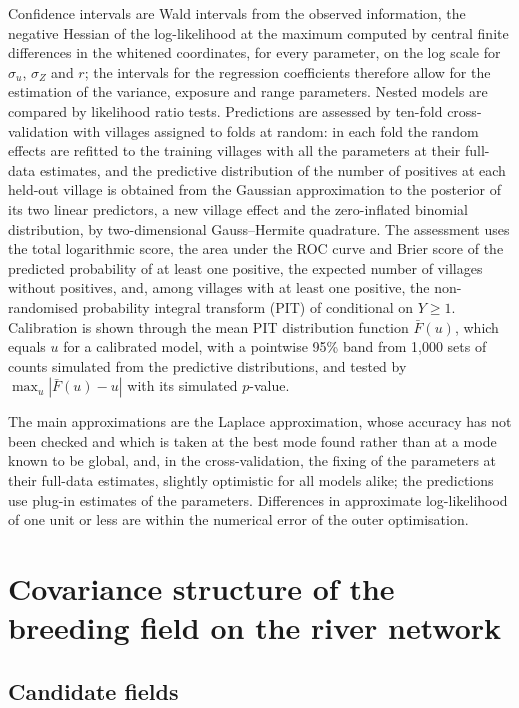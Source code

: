 \documentclass[11pt,a4paper]{article}
\begin{document}
Confidence intervals are Wald intervals from the observed information, the negative Hessian of the log-likelihood at the maximum computed by central finite differences in the whitened coordinates, for every parameter, on the log scale for $\sigma_u$, $\sigma_Z$ and $r$; the intervals for the regression coefficients therefore allow for the estimation of the variance, exposure and range parameters. Nested models are compared by likelihood ratio tests. Predictions are assessed by ten-fold cross-validation with villages assigned to folds at random: in each fold the random effects are refitted to the training villages with all the parameters at their full-data estimates, and the predictive distribution of the number of positives at each held-out village is obtained from the Gaussian approximation to the posterior of its two linear predictors, a new village effect and the zero-inflated binomial distribution, by two-dimensional Gauss--Hermite quadrature. The assessment uses the total logarithmic score, the area under the ROC curve and Brier score of the predicted probability of at least one positive, the expected number of villages without positives, and, among villages with at least one positive, the non-randomised probability integral transform (PIT) of \citet{czado2009} conditional on $Y \geq 1$. Calibration is shown through the mean PIT distribution function $\bar F(u)$, which equals $u$ for a calibrated model, with a pointwise 95\% band from 1{,}000 sets of counts simulated from the predictive distributions, and tested by $\max_u |\bar F(u) - u|$ with its simulated $p$-value.

The main approximations are the Laplace approximation, whose accuracy has not been checked and which is taken at the best mode found rather than at a mode known to be global, and, in the cross-validation, the fixing of the parameters at their full-data estimates, slightly optimistic for all models alike; the predictions use plug-in estimates of the parameters. Differences in approximate log-likelihood of one unit or less are within the numerical error of the outer optimisation.

\section{Covariance structure of the breeding field on the river network}\label{sec:fields}

\subsection*{Candidate fields}
\end{document}
